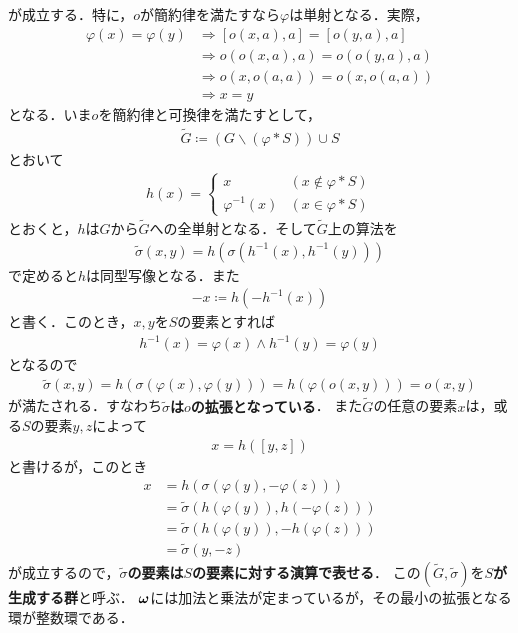	が成立する．特に，$o$が簡約律を満たすなら$\varphi$は単射となる．実際，
	\begin{align}
		\varphi(x) = \varphi(y)
		&\Longrightarrow [o(x,a),a] = [o(y,a),a] \\
		&\Longrightarrow o(o(x,a),a) = o(o(y,a),a) \\
		&\Longrightarrow o(x,o(a,a)) = o(x,o(a,a)) \\
		&\Longrightarrow x = y
	\end{align}
	となる．いま$o$を簡約律と可換律を満たすとして，
	\begin{align}
		\tilde{G} \coloneqq \left( G \backslash (\varphi \ast S) \right) \cup S
	\end{align}
	とおいて
	\begin{align}
		h(x) = 
		\begin{cases}
			x & (x \notin \varphi \ast S) \\
			\varphi^{-1}(x) & (x \in \varphi \ast S)
		\end{cases}
	\end{align}
	とおくと，$h$は$G$から$\tilde{G}$への全単射となる．そして$\tilde{G}$上の算法を
	\begin{align}
		\tilde{\sigma}(x,y) = h\left(\sigma\left(h^{-1}(x),h^{-1}(y)\right)\right)
	\end{align}
	で定めると$h$は同型写像となる．また
	\begin{align}
		-x \coloneqq h\left( -h^{-1}(x) \right)
	\end{align}
	と書く．このとき，$x,y$を$S$の要素とすれば
	\begin{align}
		h^{-1}(x) = \varphi(x) \wedge h^{-1}(y) = \varphi(y)
	\end{align}
	となるので
	\begin{align}
		\tilde{\sigma}(x,y) = h\left(\sigma\left(\varphi(x),\varphi(y)\right)\right)
		= h\left(\varphi(o(x,y))\right)
		= o(x,y)
	\end{align}
	が満たされる．すなわち{\bf $\tilde{\sigma}$は$o$の拡張となっている}．
	また$\tilde{G}$の任意の要素$x$は，或る$S$の要素$y,z$によって
	\begin{align}
		x = h([y,z])
	\end{align}
	と書けるが，このとき
	\begin{align}
		x &= h\left(\sigma(\varphi(y),-\varphi(z))\right) \\
		&= \tilde{\sigma} \left(h(\varphi(y)),h(-\varphi(z))\right) \\
		&= \tilde{\sigma} \left(h(\varphi(y)),-h(\varphi(z))\right) \\
		&= \tilde{\sigma}(y,-z)
	\end{align}
	が成立するので，{\bf $\tilde{\sigma}$の要素は$S$の要素に対する演算で表せる}．
	この$(\tilde{G},\tilde{\sigma})$を{\bf $S$が生成する群}と呼ぶ．
	${\boldsymbol \omega}$には加法と乗法が定まっているが，その最小の拡張となる環が整数環である．
	
